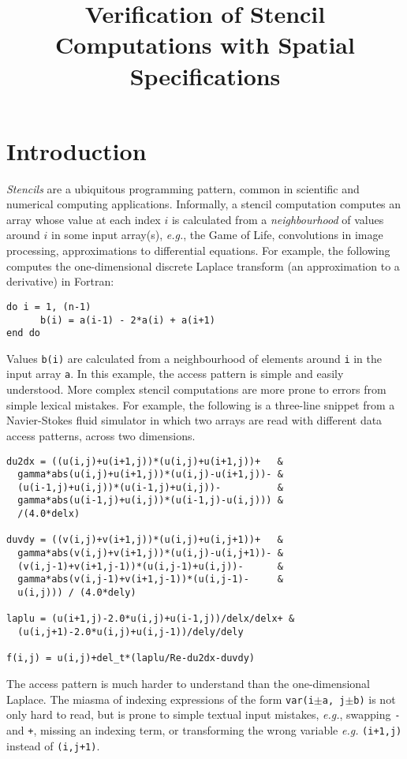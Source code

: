 \documentclass[9pt,preprint]{sigplanconf}
\title{Verification of Stencil Computations with Spatial
  Specifications}
\theoremstyle{definition}
\newcommand{\eg}{\emph{e.g.}}
\begin{document}
\maketitle




\section{Introduction}

\emph{Stencils} are a ubiquitous programming pattern, common in
scientific and numerical computing applications. Informally, a stencil
computation computes an array whose value at each index $i$ is
calculated from a \emph{neighbourhood} of values around $i$ in some
input array(s), \eg{}, the Game of Life, convolutions in image
processing, approximations to differential equations. For example, the
following computes the one-dimensional discrete Laplace transform (an
approximation to a derivative) in Fortran:
%
\begin{verbatim}
do i = 1, (n-1)
      b(i) = a(i-1) - 2*a(i) + a(i+1)
end do
\end{verbatim}
%
Values \texttt{b(i)} are calculated from a neighbourhood of elements
around \texttt{i} in the input array \texttt{a}.  In this example, the
access pattern is simple and easily understood. More complex
stencil computations are more prone to errors from simple lexical
mistakes. For example, the following is a three-line snippet from a
Navier-Stokes fluid simulator in which two arrays are read with
different data access patterns, across two dimensions.
\begin{verbatim}
du2dx = ((u(i,j)+u(i+1,j))*(u(i,j)+u(i+1,j))+   &
  gamma*abs(u(i,j)+u(i+1,j))*(u(i,j)-u(i+1,j))- &
  (u(i-1,j)+u(i,j))*(u(i-1,j)+u(i,j))-          &
  gamma*abs(u(i-1,j)+u(i,j))*(u(i-1,j)-u(i,j))) &
  /(4.0*delx)

duvdy = ((v(i,j)+v(i+1,j))*(u(i,j)+u(i,j+1))+   &
  gamma*abs(v(i,j)+v(i+1,j))*(u(i,j)-u(i,j+1))- &
  (v(i,j-1)+v(i+1,j-1))*(u(i,j-1)+u(i,j))-      &
  gamma*abs(v(i,j-1)+v(i+1,j-1))*(u(i,j-1)-     & 
  u(i,j))) / (4.0*dely)

laplu = (u(i+1,j)-2.0*u(i,j)+u(i-1,j))/delx/delx+ &
  (u(i,j+1)-2.0*u(i,j)+u(i,j-1))/dely/dely

f(i,j) = u(i,j)+del_t*(laplu/Re-du2dx-duvdy)
\end{verbatim}
The access pattern is much harder to understand than the
one-dimensional Laplace.  The miasma of indexing expressions of the
form \texttt{var(i$\pm$a, j$\pm$b)} is not only hard to read, but is
prone to simple textual input mistakes, \eg{}, swapping \texttt{-} and
\texttt{+}, missing an indexing term, or transforming the wrong
variable \eg{} \texttt{(i+1,j)} instead of \texttt{(i,j+1)}.
\end{document}
